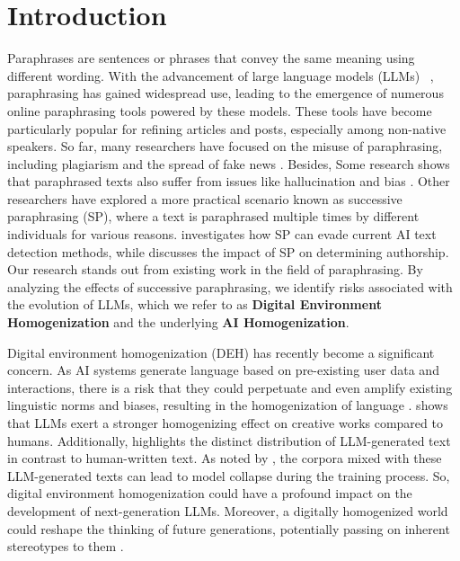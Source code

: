\section{Introduction}




Paraphrases are sentences or phrases that convey the same meaning using different wording\citep{bhagat2013what}.
With the advancement of large language models (LLMs) ~\citep{llama,gpt3,gpt4}, paraphrasing has gained widespread use, leading to the emergence of numerous online paraphrasing tools powered by these models. 
These tools have become particularly popular for refining articles and posts, especially among non-native speakers.
So far, many researchers have focused on the misuse of paraphrasing, including plagiarism \citep{plagiarism} and the spread of fake news \citep{detect-gpt}.
Besides, Some research shows that paraphrased texts also suffer from issues like hallucination \citep{llm_hallu,llm_hallu2} and bias \citep{llm_bias}.
Other researchers have explored a more practical scenario known as successive paraphrasing (SP), where a text is paraphrased multiple times by different individuals for various reasons. 
\cite{can_ai} investigates how SP can evade current AI text detection methods, while \cite{ship} discusses the impact of SP on determining authorship.
Our research stands out from existing work in the field of paraphrasing. 
By analyzing the effects of successive paraphrasing, we identify risks associated with the evolution of LLMs, which we refer to as \textbf{Digital Environment Homogenization} and the underlying \textbf{AI Homogenization}.


Digital environment homogenization (DEH) has recently become a significant concern.
As AI systems generate language based on pre-existing user data and interactions, there is a risk that they could perpetuate and even amplify existing linguistic norms and biases, resulting in the homogenization of language \citep{homogenization}.
\cite{anderson2024homogenization} shows that LLMs exert a stronger homogenizing effect on creative works compared to humans. 
Additionally, \cite{deepfake} highlights the distinct distribution of LLM-generated text in contrast to human-written text. 
As noted by \cite{shumailov2023curse}, the corpora mixed with these LLM-generated texts can lead to model collapse during the training process.
So, digital environment homogenization could have a profound impact on the development of next-generation LLMs.
Moreover, a digitally homogenized world could reshape the thinking of future generations, potentially passing on inherent stereotypes to them \citep{kotek2023gender,shrawgi-etal-2024-uncovering}.

